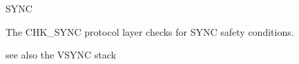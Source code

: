 \begin{Layer}{SYNC}
\begin{Sources}
\end{Sources}

\begin{GenEvent}
\genevent{\UpBlockOk}
\genevent{\DnAck}
\genevent{\DnBlock}
\end{GenEvent}

\begin{Testing}
\item
The CHK\_SYNC protocol layer checks for SYNC safety conditions.
\item 
see also the VSYNC stack
\end{Testing}
\end{Layer}
